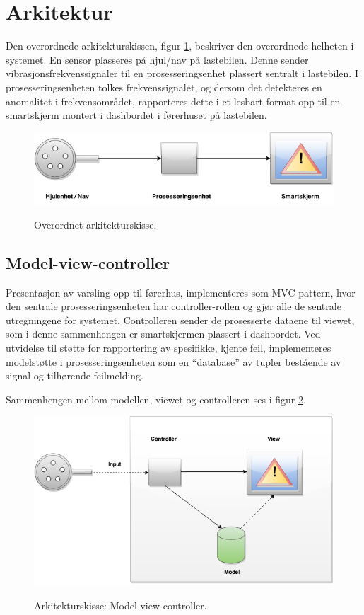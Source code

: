 \section{Arkitektur}
Den overordnede arkitekturskissen, figur \ref{fig:overordnet-ark}, 
beskriver den overordnede helheten i systemet. En sensor plasseres på 
hjul/nav på lastebilen. Denne sender vibrasjonsfrekvenssignaler til en 
prosesseringsenhet plassert sentralt i lastebilen. I prosesseringsenheten 
tolkes frekvenssignalet, og dersom det detekteres en anomalitet i 
frekvensområdet, rapporteres dette i et lesbart format opp til en 
smartskjerm montert i dashbordet i førerhuset på lastebilen.
\newline
\begin{figure}[H]
	\centering
	\includegraphics[width=1.00\textwidth]{images/arkitektur-overordnet.png}
	\label{fig:overordnet-ark}
	\caption{Overordnet arkitekturskisse.}
\end{figure}

\subsection{Model-view-controller}
\label{sec:arkitektur}
Presentasjon av varsling opp til førerhus, implementeres som MVC-pattern, 
hvor den sentrale prosesseringsenheten har controller-rollen og gjør alle 
de sentrale utregningene for systemet. Controlleren sender de prosesserte 
dataene til viewet, som i denne sammenhengen er smartskjermen plassert i 
dashbordet. Ved utvidelse til støtte for rapportering av spesifikke, 
kjente feil, implementeres modelstøtte i prosesseringsenheten som en 
``database'' av tupler bestående av signal og tilhørende feilmelding. 

Sammenhengen mellom modellen, viewet og controlleren ses i figur \ref{fig:mvc}.
\newline
\begin{figure}[H]
	\centering
	\includegraphics[width=1.00\textwidth]{images/architecture2-mvc.png}
	\label{fig:mvc}
	\caption{Arkitekturskisse: Model-view-controller.}
\end{figure}